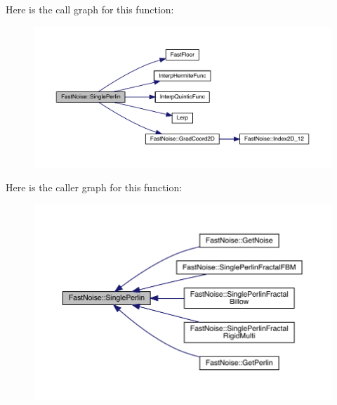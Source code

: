 Here is the call graph for this function\+:
\nopagebreak
\begin{figure}[H]
\begin{center}
\leavevmode
\includegraphics[width=350pt]{d1/dd8/class_fast_noise_a2dd412856eb0d588fe8fbcb529517455_cgraph}
\end{center}
\end{figure}
Here is the caller graph for this function\+:
\nopagebreak
\begin{figure}[H]
\begin{center}
\leavevmode
\includegraphics[width=350pt]{d1/dd8/class_fast_noise_a2dd412856eb0d588fe8fbcb529517455_icgraph}
\end{center}
\end{figure}
\mbox{\label{class_fast_noise_a93f68e6b4d364be7359076d5c7f19313}} 
